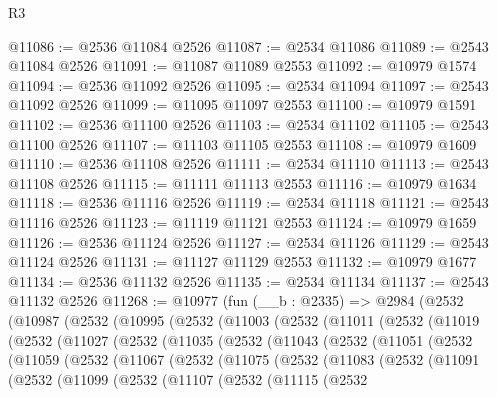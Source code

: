\begin{lexlean}{R3}
\begin{coremodule}
@11086 := @2536 @11084 @2526
@11087 := @2534 @11086
@11089 := @2543 @11084 @2526
@11091 := @11087 @11089 @2553
@11092 := @10979 @1574
@11094 := @2536 @11092 @2526
@11095 := @2534 @11094
@11097 := @2543 @11092 @2526
@11099 := @11095 @11097 @2553
@11100 := @10979 @1591
@11102 := @2536 @11100 @2526
@11103 := @2534 @11102
@11105 := @2543 @11100 @2526
@11107 := @11103 @11105 @2553
@11108 := @10979 @1609
@11110 := @2536 @11108 @2526
@11111 := @2534 @11110
@11113 := @2543 @11108 @2526
@11115 := @11111 @11113 @2553
@11116 := @10979 @1634
@11118 := @2536 @11116 @2526
@11119 := @2534 @11118
@11121 := @2543 @11116 @2526
@11123 := @11119 @11121 @2553
@11124 := @10979 @1659
@11126 := @2536 @11124 @2526
@11127 := @2534 @11126
@11129 := @2543 @11124 @2526
@11131 := @11127 @11129 @2553
@11132 := @10979 @1677
@11134 := @2536 @11132 @2526
@11135 := @2534 @11134
@11137 := @2543 @11132 @2526
@11268 := @10977
    (fun (__b : @2335) =>
    @2984
      (@2532
        (@10987
          (@2532
            (@10995
              (@2532
                (@11003
                  (@2532
                    (@11011
                      (@2532
                        (@11019
                          (@2532
                            (@11027
                              (@2532
                                (@11035
                                  (@2532
                                    (@11043
                                      (@2532
                                        (@11051
                                          (@2532
                                            (@11059
                                              (@2532
                                                (@11067
                                                  (@2532
                                                    (@11075
                                                      (@2532
                                                        (@11083
                                                          (@2532
                                                            (@11091
                                                              (@2532
                                                                (@11099
                                                                  (@2532
                                                                    (@11107
                                                                      (@2532
                                                                        (@11115
                                                                          (@2532

\end{coremodule}
\end{lexlean}
